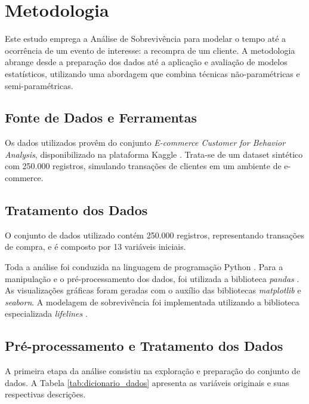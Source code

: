 \section{Metodologia}
Este estudo emprega a Análise de Sobrevivência para modelar o tempo até a ocorrência de um evento de interesse: a recompra de um cliente. A metodologia abrange desde a preparação dos dados até a aplicação e avaliação de modelos estatísticos, utilizando uma abordagem que combina técnicas não-paramétricas e semi-paramétricas.

\subsection{Fonte de Dados e Ferramentas}
Os dados utilizados provêm do conjunto \textit{E-commerce Customer for Behavior Analysis}, disponibilizado na plataforma Kaggle \cite{kaggle_dataset}. Trata-se de um dataset sintético com 250.000 registros, simulando transações de clientes em um ambiente de e-commerce.

\subsection{Tratamento dos Dados}
O conjunto de dados utilizado contém 250.000 registros, representando transações de compra, e é composto por 13 variáveis iniciais. 

Toda a análise foi conduzida na linguagem de programação Python \cite{python_soft}. Para a manipulação e o pré-processamento dos dados, foi utilizada a biblioteca \textit{pandas} \cite{mckinney_pandas}. As visualizações gráficas foram geradas com o auxílio das bibliotecas \textit{matplotlib} e \textit{seaborn}. A modelagem de sobrevivência foi implementada utilizando a biblioteca especializada \textit{lifelines} \cite{davidson_pilon_lifelines}.

\subsection{Pré-processamento e Tratamento dos Dados}
A primeira etapa da análise consistiu na exploração e preparação do conjunto de dados. A Tabela \ref{tab:dicionario_dados} apresenta as variáveis originais e suas respectivas descrições.

